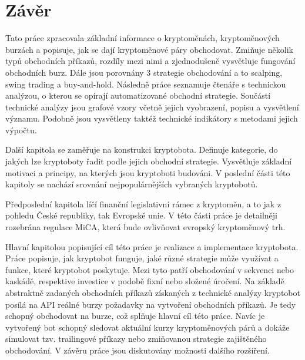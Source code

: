 \chapter{Závěr}
Tato práce zpracovala základní informace o kryptoměnách, kryptoměnových burzách a popisuje, jak se dají kryptoměnové
páry obchodovat. Zmiňuje několik typů obchodních příkazů, rozdíly mezi nimi a zjednodušeně vysvětluje fungování obchodních burz. Dále jsou
porovnány 3 strategie obchodování a to scalping, swing trading a buy-and-hold. Následně práce seznamuje čtenáře s technickou analýzou, o kterou
se opírají automatizované obchodní strategie.
Součástí technické analýzy jsou grafové vzory včetně jejich vyobrazení, popisu a vysvětlení významu. Podobně jsou vysvětleny taktéž technické
indikátory s metodami jejich výpočtu.

Další kapitola se zaměřuje na konstrukci kryptobota. Definuje kategorie, do jakých lze kryptoboty řadit podle jejich obchodní strategie. Vysvětluje
základní motivaci a principy, na kterých jsou kryptoboti budováni. V poslední části této kapitoly se nachází srovnání nejpopulárnějších vybraných
kryptobotů.

Předposlední kapitola líčí finanční legislativní rámec z kryptoměn, a to jak z pohledu České republiky, tak Evropské unie. V této části práce je
detailněji rozebrána regulace MiCA, která bude ovlivňovat evropský kryptoměnový trh.

Hlavní kapitolou popisující cíl této práce je realizace a implementace kryptobota. Práce popisuje, jak kryptobot funguje, jaké různé strategie
může využívat a funkce, které kryptobot poskytuje. Mezi tyto patří obchodování v sekvenci nebo kaskádě, respektive investice v podobě fixní nebo složené úročení.
Na základě abstraktně zadaných obchodních příkazů získaných z technické analýzy kryptobot posílá na API reálné burzy požadavky na vytvoření obchodních příkazů.
Je tedy schopný obchodovat na burze, což splňuje hlavní cíl této práce. Navíc je vytvořený bot schopný sledovat aktuální kurzy kryptoměnových párů a dokáže
simulovat tzv. trailingové příkazy nebo zmiňovanou strategie zajištěného obchodování. V závěru práce jsou diskutovány možnosti dalšího rozšíření.


\endinput
